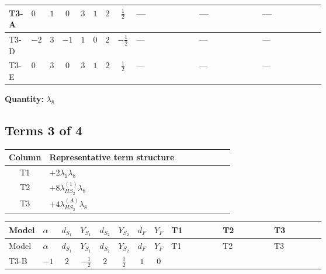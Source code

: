 \documentclass[8pt]{article}
\begin{document}
\begin{landscape}
\begin{longtable}{@{}llcccccc >{\raggedright\arraybackslash}p{0.21\linewidth} >{\raggedright\arraybackslash}p{0.21\linewidth} >{\raggedright\arraybackslash}p{0.21\linewidth}@{}}
\midrule
T3-A & $0$ & $1$ & $0$ & $3$ & $1$ & $2$ & $\frac{1}{2}$ & --- & --- & --- \\
\midrule
T3-D & $-2$ & $3$ & $-1$ & $1$ & $0$ & $2$ & $-\frac{1}{2}$ & --- & --- & --- \\
\midrule
T3-E & $0$ & $3$ & $0$ & $3$ & $1$ & $2$ & $\frac{1}{2}$ & --- & --- & --- \\
\midrule
\bottomrule
\end{longtable}
\clearpage
\noindent\textbf{Quantity: }$\lambda_{8}$\par\smallskip
\subsection*{Terms 3 of 4}
\begin{center}
\begin{tabular}{@{}c >{\raggedright\arraybackslash}p{0.82\linewidth}@{}}
\toprule
Column & Representative term structure \\
\midrule
T1 & \(\displaystyle +2 {\lambda_1} {\lambda_{8}}\) \\
\midrule
T2 & \(\displaystyle +8 {\lambda_{HS_2}^{(1)}} {\lambda_{8}}\) \\
\midrule
T3 & \(\displaystyle +4 {\lambda_{HS_2}^{(A)}} {\lambda_{8}}\) \\
\midrule
\bottomrule
\end{tabular}
\end{center}
\smallskip
\tiny
\begin{longtable}{@{}llcccccc >{\raggedright\arraybackslash}p{0.21\linewidth} >{\raggedright\arraybackslash}p{0.21\linewidth} >{\raggedright\arraybackslash}p{0.21\linewidth}@{}}
\toprule
Model & $\alpha$ & $d_{S_1}$ & $Y_{S_1}$ & $d_{S_2}$ & $Y_{S_2}$ & $d_F$ & $Y_F$ & T1 & T2 & T3 \\
\midrule
\endfirsthead
\toprule
Model & $\alpha$ & $d_{S_1}$ & $Y_{S_1}$ & $d_{S_2}$ & $Y_{S_2}$ & $d_F$ & $Y_F$ & T1 & T2 & T3 \\
\midrule
\endhead
T3-B & $-1$ & $2$ & $-\frac{1}{2}$ & $2$ & $\frac{1}{2}$ & $1$ & $0$ & \scriptsize\adjustbox{max width=\linewidth}{$\begin{gathered} +2 {\lambda_1} {\lambda_{8}}\end{gathered}$} & \scriptsize\adjustbox{max width=\linewidth}{$\begin{gathered} +8 {\lambda_{HS_2}^{(1)}} {\lambda_{8}}\end{gathered}$} & \scriptsize\adjustbox{max width=\linewidth}{$\begin{gathered} +4 {\lambda_{HS_2}^{(A)}} {\lambda_{8}}\end{gathered}$} \\

\end{longtable}
\end{landscape}
\end{document}

